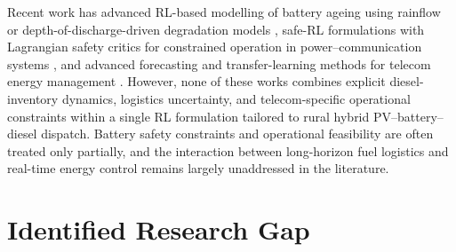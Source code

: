 Recent work has advanced RL-based modelling of battery ageing using
rainflow or depth-of-discharge-driven degradation models
\citep{alhajhassan_2024_battery_ageing_rl,deng_2025_5g_microgrid_ka},
safe-RL formulations with Lagrangian safety critics for constrained
operation in power--communication systems \citep{yan_2025_safe_marl_bs},
and advanced forecasting and transfer-learning methods for telecom
energy management \citep{ma_pan_2025_telecom_ies,cho_2025_solar_smallcell_ddqn}.
However, none of these works combines explicit diesel-inventory dynamics,
logistics uncertainty, and telecom-specific operational constraints within
a single RL formulation tailored to rural hybrid PV--battery--diesel
dispatch.  Battery safety constraints and operational feasibility are often
treated only partially, and the interaction between long-horizon fuel
logistics and real-time energy control remains largely unaddressed in the
literature.

\section{Identified Research Gap}

